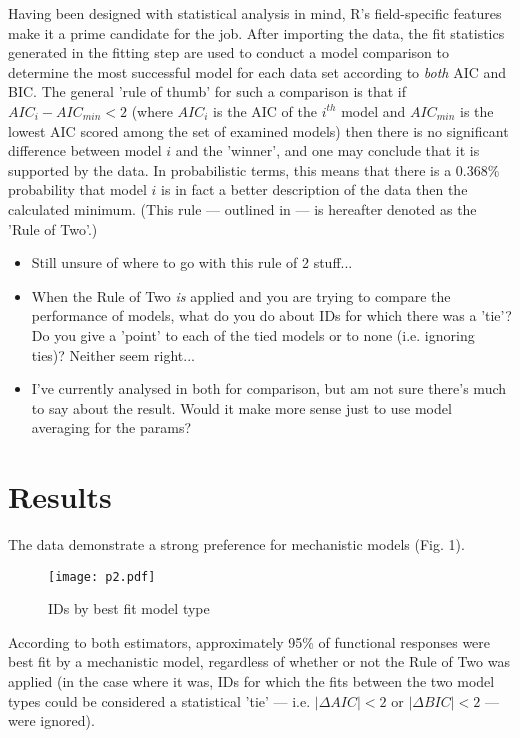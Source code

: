 \documentclass[11pt]{article}
\begin{document}
    Having been designed with statistical analysis in mind, R's field-specific features make it a prime candidate for the job. After importing the data, the fit statistics generated in the fitting step are used to conduct a model comparison to determine the most successful model for each data set according to \emph{both} AIC and BIC. The general 'rule of thumb' for such a comparison is that if $AIC_i-AIC_{min}<2$ (where $AIC_i$ is the AIC of the $i^{th}$ model and $AIC_{min}$ is the lowest AIC scored among the set of examined models) then there is no significant difference between model $i$ and the 'winner', and one may conclude that it is supported by the data. In probabilistic terms, this means that there is a $0.368\%$ probability that model $i$ is in fact a better description of the data then the calculated minimum. (This rule — outlined in \textcite{anderson2004model} — is hereafter denoted as the 'Rule of Two'.)
    \begin{itemize}
      \item Still unsure of where to go with this rule of 2 stuff...
      \item When the Rule of Two \emph{is} applied and you are trying to compare the performance of models, what do you do about IDs for which there was a 'tie'? Do you give a 'point' to each of the tied models or to none (i.e. ignoring ties)? Neither seem right...
      \item I've currently analysed in both for comparison, but am not sure there's much to say about the result. Would it make more sense just to use model averaging for the params?
    \end{itemize}

    
    \section{Results}
    The data demonstrate a strong preference for mechanistic models (Fig. 1). 
    \begin{figure}[H]
	    \centering\texttt{[image: p2.pdf]}
	    \caption{IDs by best fit model type}
    \end{figure}
    According to both estimators,  approximately 95\% of functional responses were best fit by a mechanistic model, regardless of whether or not the Rule of Two was applied (in the case where it was, IDs for which the fits between the two model types could be considered a statistical 'tie' — i.e. $|\Delta{AIC}|<2$ or $|\Delta{BIC}|<2$ — were ignored).
    
\end{document}
